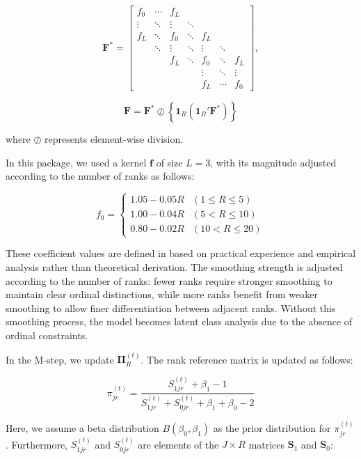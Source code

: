 \[
\mathbf{F}^* = \begin{bmatrix}
f_0 & \cdots & f_L & & & & \\
\vdots & \ddots & \vdots & \ddots & & & \\
f_L & \ddots & f_0 & \ddots & f_L & & \\
& \ddots & \vdots & \ddots & \vdots & \ddots & \\
& & f_L & \ddots & f_0 & \ddots & f_L \\
& & & & \vdots & \ddots & \vdots \\
& & & & f_L & \cdots & f_0
\end{bmatrix},
\]

\[
\mathbf{F} = \mathbf{F}^* \oslash \left\{ \mathbf{1}_{R} (\mathbf{1}_{R}' \mathbf{F}^*) \right\}
\]

\noindent where \(\oslash\) represents element-wise division.

In this package, we used a kernel \(\mathbf{f}\) of size \(L=3\), with its magnitude adjusted according to the number of ranks as follows:

\[
f_0 =
\begin{cases}
1.05 - 0.05 R & (1 \leq R \leq 5) \\
1.00 - 0.04 R & (5 < R \leq 10) \\
0.80 - 0.02 R & (10 < R \leq 20)
\end{cases}
\]

These coefficient values are defined in \citet{shojima} based on practical experience and empirical analysis rather than theoretical derivation. The smoothing strength is adjusted according to the number of ranks: fewer ranks require stronger smoothing to maintain clear ordinal distinctions, while more ranks benefit from weaker smoothing to allow finer differentiation between adjacent ranks. Without this smoothing process, the model becomes latent class analysis due to the absence of ordinal constraints.

In the M-step, we update \(\boldsymbol{\Pi}_R^{(t)}\). The rank reference matrix is updated as follows:

\[
\pi_{j r}^{(t)} = \frac{S_{1 j r}^{(t)} + \beta_1 - 1}{S_{1 j r}^{(t)} + S_{0 j r}^{(t)} + \beta_1 + \beta_0 - 2}
\]

Here, we assume a beta distribution \(B(\beta_0,\beta_1)\) as the prior distribution for \(\pi_{j r}^{(t)}\). Furthermore, \(S_{1 j r}^{(t)}\) and \(S_{0 j r}^{(t)}\) are elements of the \(J \times R\) matrices \(\mathbf{S}_1\) and \(\mathbf{S}_0\):

